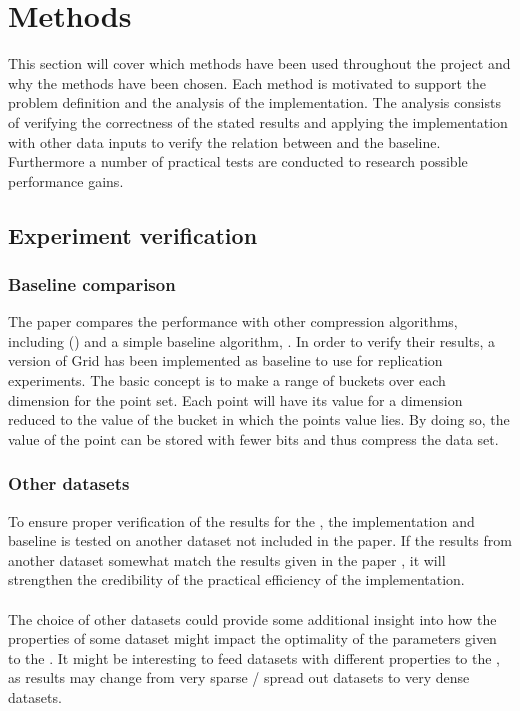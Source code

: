 \section{Methods}
\label{methods}
This section will cover which methods have been used throughout the project and why the methods have been chosen. Each method is motivated to support the problem definition and the analysis of the \qs{} implementation. The analysis consists of verifying the correctness of the stated results and applying the implementation with other data inputs to verify the relation between \qs{} and the baseline. Furthermore a number of practical tests are conducted to research possible performance gains.

\subsection{Experiment verification}

\subsubsection{Baseline comparison}
The paper compares the \qs{} performance with other compression algorithms, including (\pq{}) and a simple baseline algorithm, \gr{}. In order to verify their results, a version of Grid has been implemented as baseline to use for replication experiments. The basic concept is to make a range of buckets over each dimension for the point set. Each point will have its value for a dimension reduced to the value of the bucket in which the points value lies. By doing so, the value of the point can be stored with fewer bits and thus compress the data set.

\subsubsection{Other datasets}
To ensure proper verification of the results for the \qs{}, the implementation and baseline is tested on another dataset not included in the paper. If the results from another dataset somewhat match the results given in the paper \cite{wagner17}, it will strengthen the credibility of the practical efficiency of the \qs{} implementation.
\\
\\
The choice of other datasets could provide some additional insight into how the properties of some dataset might impact the optimality of the parameters given to the \qs{}. It might be interesting to feed datasets with different properties to the \qs{}, as results may change from very sparse / spread out datasets to very dense datasets.

